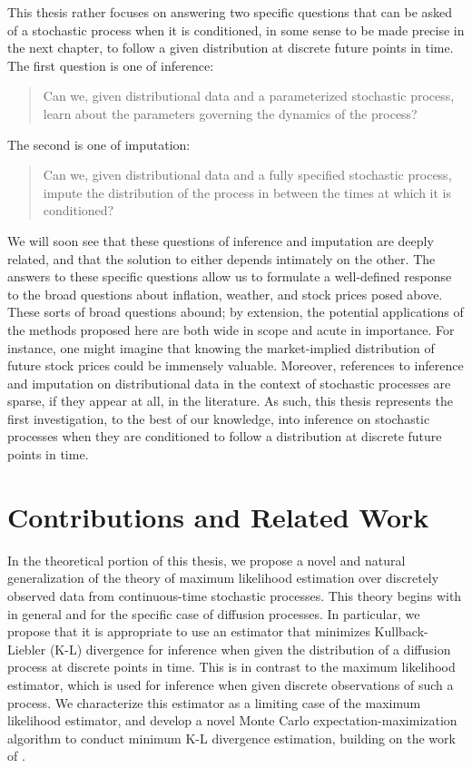 This thesis rather focuses on answering two specific questions that
can be asked of a stochastic process when it is conditioned, in some
sense to be made precise in the next chapter, to follow a given distribution
at discrete future points in time. The first question is one of inference:
\begin{quote}
Can we, given distributional data and a parameterized stochastic process,
learn about the parameters governing the dynamics of the process? 
\end{quote}
The second is one of imputation:
\begin{quote}
Can we, given distributional data and a fully specified stochastic
process, impute the distribution of the process in between the times
at which it is conditioned?
\end{quote}
We will soon see that these questions of inference and imputation
are deeply related, and that the solution to either depends intimately
on the other. The answers to these specific questions allow us to
formulate a well-defined response to the broad questions about inflation,
weather, and stock prices posed above. These sorts of broad questions
abound; by extension, the potential applications of the methods proposed
here are both wide in scope and acute in importance. For instance,
one might imagine that knowing the market-implied distribution of
future stock prices could be immensely valuable. Moreover, references
to inference and imputation on distributional data in the context
of stochastic processes are sparse, if they appear at all, in the
literature. As such, this thesis represents the first investigation,
to the best of our knowledge, into inference on stochastic processes
when they are conditioned to follow a distribution at discrete future
points in time.


\section{Contributions and Related Work}

In the theoretical portion of this thesis, we propose a novel and
natural generalization of the theory of maximum likelihood estimation
over discretely observed data from continuous-time stochastic processes.
This theory begins with \citet{rao-1988} in general and \citet{yoshida-1992}
for the specific case of diffusion processes. In particular, we propose
that it is appropriate to use an estimator that minimizes Kullback-Liebler
(K-L) divergence for inference when given the distribution of a diffusion
process at discrete points in time. This is in contrast to the maximum
likelihood estimator, which is used for inference when given discrete
observations of such a process. We characterize this estimator as
a limiting case of the maximum likelihood estimator, and develop a
novel Monte Carlo expectation-maximization algorithm to conduct minimum
K-L divergence estimation, building on the work of \citet{beskos-2006}. 

